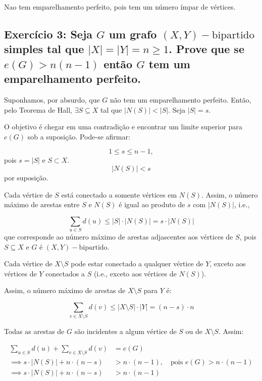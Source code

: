 \documentclass{article}
\begin{document}
 
 Nao tem emparelhamento perfeito, pois tem um número ímpar de vértices.
\clearpage


 \subsection{Exercício 3:  Seja $G$ um grafo $(X, Y)-\text{bipartido}$ simples tal que $|X| = |Y | = n \geq 1$. Prove que se $e(G) > n(n - 1)$ então $G$ tem um emparelhamento perfeito.}
 
 Suponhamos, por absurdo, que $G$ não tem um emparelhamento perfeito. Então, pelo Teorema de Hall, $\exists S \subseteq X$ tal que $|N(S)| < |S|$. Seja $|S| = s$.
 
 O objetivo é chegar em uma contradição e encontrar um limite superior para $e(G)$ sob a suposição. Pode-se afirmar:
 
 $$1 \leq s \leq n - 1,$$ pois $s = |S|$ e $S \subset X$.  
 $$|N(S)| < s$$ por suposição.
 
 Cada vértice de $S$ está conectado a somente vértices em $N(S)$. Assim, o número máximo de arestas entre $S$ e $N(S)$ é igual ao produto de $s$ com $|N(S)|$, i.e.,
 
 $$\sum_{u \in S} d(u) \leq |S| \cdot |N(S)| = s \cdot |N(S)|$$  
 que corresponde ao número máximo de arestas adjascentes aos vértices de $S$, pois $S \subseteq X$ e $G$ é $(X, Y)-\text{bipartido}$.
 
 Cada vértice de $X \setminus S$ pode estar conectado a qualquer vértice de $Y$, exceto aos vértices de $Y$ conectados a $S$ (i.e., exceto aos vértices de $N(S)$).
 
 Assim, o número máximo de arestas de $X \setminus S$ para $Y$ é:
 
 $$\sum_{v \in X \setminus S} d(v) \leq |X \setminus S| \cdot |Y| = (n - s) \cdot n$$
 
 Todas as arestas de $G$ são incidentes a algum vértice de $S$ ou de $X \setminus S$. Assim:
 
 
 \begin{align*}
 	\sum_{u \in S} d(u) + \sum_{v \in X \setminus S} d(v) &= e(G) \\
 	\implies s \cdot |N(S)| + n \cdot (n - s) &> n \cdot (n - 1), \quad \text{pois } e(G) > n \cdot (n - 1) \\ 
 	\implies s \cdot |N(S)| + n \cdot (n - s) &> n \cdot (n - 1) \\
 \end{align*}
 
\end{document}
